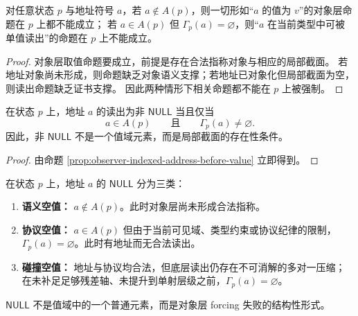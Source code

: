 \begin{proposition}[地址先于取值]\label{prop:observer-indexed-address-before-value}
对任意状态 \(p\) 与地址符号 \(a\)，若 \(a\notin A(p)\)，则一切形如“\(a\) 的值为 \(v\)”的对象层命题在 \(p\) 上都不能成立；
若 \(a\in A(p)\) 但 \(\Gamma_p(a)=\varnothing\)，则“\(a\) 在当前类型中可被单值读出”的命题在 \(p\) 上不能成立。
\end{proposition}

\begin{proof}
对象层取值命题要成立，前提是存在合法指称对象与相应的局部截面。
若地址对象尚未形成，则命题缺乏对象语义支撑；若地址已对象化但局部截面为空，则读出命题缺乏证书支撑。
因此两种情形下相关命题都不能在 \(p\) 上被强制。
\end{proof}

\begin{corollary}\label{cor:observer-indexed-nonnull-criterion}
在状态 \(p\) 上，地址 \(a\) 的读出为非 \(\mathsf{NULL}\) 当且仅当
\[
a\in A(p)
\qquad\text{且}\qquad
\Gamma_p(a)\neq \varnothing.
\]
因此，非 \(\mathsf{NULL}\) 不是一个值域元素，而是局部截面的存在性条件。
\end{corollary}

\begin{proof}
由命题 \ref{prop:observer-indexed-address-before-value} 立即得到。
\end{proof}

\begin{definition}\label{def:observer-indexed-null-trichotomy}
在状态 \(p\) 上，地址 \(a\) 的 \(\mathsf{NULL}\) 分为三类：
\begin{enumerate}
  \item \textbf{语义空值：} \(a\notin A(p)\)。此时对象层尚未形成合法指称。
  \item \textbf{协议空值：} \(a\in A(p)\) 但由于当前可见域、类型约束或协议纪律的限制，\(\Gamma_p(a)=\varnothing\)。此时有地址而无合法读出。
  \item \textbf{碰撞空值：} 地址与协议均合法，但底层读出仍存在不可消解的多对一压缩；在未补足足够残差轴、未提升到单射层级之前，\(\Gamma_p(a)=\varnothing\)。
\end{enumerate}
\end{definition}

\begin{proposition}\label{prop:observer-indexed-null-structural}
\(\mathsf{NULL}\) 不是值域中的一个普通元素，而是对象层 forcing 失败的结构性形式。
\end{proposition}

